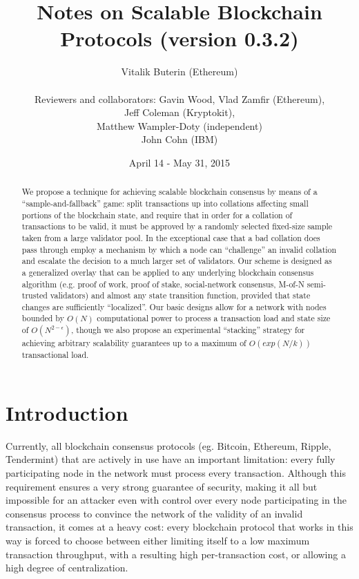 \documentclass[11pt,a4paper]{article}
\makeatletter
\theoremstyle{plain}
\theoremstyle{definition}
\theoremstyle{remark}
\newcommand{\eg}{e.g.\@\xspace}
\makeatother
\begin{document}
\title{Notes on Scalable Blockchain Protocols (version 0.3.2)}
\date{April 14 - May 31, 2015}
\author{Vitalik Buterin (Ethereum) \\  \\ Reviewers and collaborators: Gavin Wood, Vlad Zamfir (Ethereum), \\ Jeff Coleman (Kryptokit), \\ Matthew Wampler-Doty (independent) \\ John Cohn (IBM)}

\maketitle

\begin{abstract}
We propose a technique for achieving scalable blockchain consensus by means of a ``sample-and-fallback'' game: split transactions up into collations affecting small portions of the blockchain state, and require that in order for a collation of transactions to be valid, it must be approved by a randomly selected fixed-size sample taken from a large validator pool. In the exceptional case that a bad collation does pass through employ a mechanism by which a node can ``challenge'' an invalid collation and escalate the decision to a much larger set of validators. Our scheme is designed as a generalized overlay that can be applied to any underlying blockchain consensus algorithm (\eg proof of work, proof of stake, social-network consensus, M-of-N semi-trusted validators) and almost any state transition function, provided that state changes are sufficiently ``localized''. Our basic designs allow for a network with nodes bounded by $O(N)$ computational power to process a transaction load and state size of $O(N^{2-\epsilon})$, though we also propose an experimental ``stacking'' strategy for achieving arbitrary scalability guarantees up to a maximum of $O(exp(N/k))$ transactional load.
\end{abstract}

\section{Introduction}

Currently, all blockchain consensus protocols (eg. Bitcoin, Ethereum, Ripple, Tendermint) that are actively in use have an important limitation: every fully participating node in the network must process every transaction. Although this requirement ensures a very strong guarantee of security, making it all but impossible for an attacker even with control over every node participating in the consensus process to convince the network of the validity of an invalid transaction, it comes at a heavy cost: every blockchain protocol that works in this way is forced to choose between either limiting itself to a low maximum transaction throughput, with a resulting high per-transaction cost, or allowing a high degree of centralization.
\end{document}
